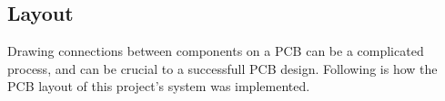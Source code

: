 \subsection{Layout}

Drawing connections between components on a PCB can be a complicated process,
and can be crucial to a successfull PCB design. Following is how the PCB layout
of this project's system was implemented.



